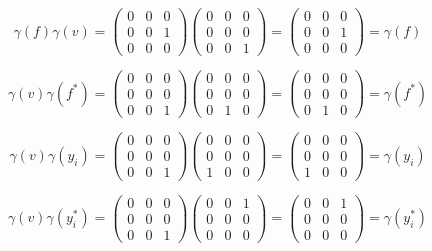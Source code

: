 \begin{solution}
    $$\gamma(f)\gamma(v)=\left(\begin{array}{ccc} 0 & 0 & 0 \\ 0 & 0 & 1 \\ 0 & 0 & 0 \end{array}\right)
    \left(\begin{array}{ccc} 0 & 0 & 0 \\ 0 & 0 & 0 \\ 0 & 0 & 1 \end{array}\right)
    =\left(\begin{array}{ccc} 0 & 0 & 0 \\ 0 & 0 & 1 \\ 0 & 0 & 0 \end{array}\right)=\gamma(f)$$

    $$\gamma(v)\gamma(f^*)=
    \left(\begin{array}{ccc} 0 & 0 & 0 \\ 0 & 0 & 0 \\ 0 & 0 & 1 \end{array}\right)
    \left(\begin{array}{ccc} 0 & 0 & 0 \\ 0 & 0 & 0 \\ 0 & 1 & 0 \end{array}\right)
    =\left(\begin{array}{ccc} 0 & 0 & 0 \\ 0 & 0 & 0 \\ 0 & 1 & 0 \end{array}\right)=\gamma(f^*)$$

    $$\gamma(v)\gamma(y_i)=
    \left(\begin{array}{ccc} 0 & 0 & 0 \\ 0 & 0 & 0 \\ 0 & 0 & 1 \end{array}\right)
    \left(\begin{array}{ccc} 0 & 0 & 0 \\ 0 & 0 & 0 \\ 1 & 0 & 0 \end{array}\right)
    =\left(\begin{array}{ccc} 0 & 0 & 0 \\ 0 & 0 & 0 \\ 1 & 0 & 0 \end{array}\right)=\gamma(y_i)$$

    $$\gamma(v)\gamma(y_i^*)=
    \left(\begin{array}{ccc} 0 & 0 & 0 \\ 0 & 0 & 0 \\ 0 & 0 & 1 \end{array}\right)
    \left(\begin{array}{ccc} 0 & 0 & 1 \\ 0 & 0 & 0 \\ 0 & 0 & 0 \end{array}\right)
    =\left(\begin{array}{ccc} 0 & 0 & 1 \\ 0 & 0 & 0 \\ 0 & 0 & 0 \end{array}\right)=\gamma(y_i^*)$$


\end{solution}
